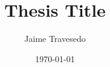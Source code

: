 \documentclass[a4paper,oneside,nobib]{tufte-book}
\begin{document}
\title{Thesis Title}
\author{Jaime Travesedo}
\date{\today}
\maketitle

\tableofcontents
\listoffigures
\listoftables








\printbibliography
\end{document}
